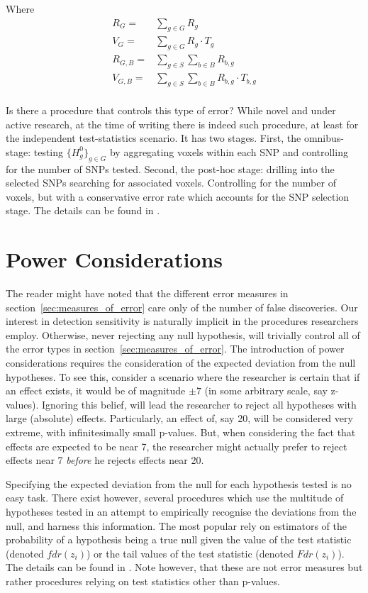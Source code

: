 \documentclass[draft,12pt]{article}
\begin{document}
Where 
\begin{align*} 
   R_G = {}& \sum_{g \in G} R_g \\
   V_G = {}& \sum_{g \in G} R_g \cdot T_g \\
   R_{G,B} = {}& \sum_{g \in S} \sum_{b \in B} R_{b,g}\\
   V_{G,B} = {}& \sum_{g \in S} \sum_{b \in B} R_{b,g} \cdot T_{b,g}  \\
\end{align*}

Is there a procedure that controls this type of error? While novel and under active research, at the time of writing there is indeed such procedure, at least for the independent test-statistics scenario. It has two stages. 
First, the omnibus-stage:  testing $\{H^0_{g}\}_{g \in G}$ by aggregating voxels within each SNP and controlling for the number of SNPs tested. Second, the post-hoc stage: drilling into the selected SNPs searching for associated voxels. Controlling for the number of voxels, but with a conservative error rate which accounts for the SNP selection stage. 
The details can be found in \citet{benjamini_adjusting_2011}.




\section{Power Considerations}
The reader might have noted that the different error measures in section~\ref{sec:measures_of_error} care only of the number of false discoveries. Our interest in detection sensitivity is naturally implicit in the procedures researchers employ. Otherwise, never rejecting any null hypothesis, will trivially control all of the error types in section~\ref{sec:measures_of_error}. 
The introduction of power considerations requires the consideration of the expected deviation from the null hypotheses. To see this, consider a scenario where the researcher is certain that if an effect exists, it would be of magnitude $\pm7$ (in some arbitrary scale, say z-values). Ignoring this belief, will lead the researcher to reject all hypotheses with large (absolute) effects. Particularly, an effect of, say 20,  will be considered very extreme, with infinitesimally small p-values. But, when considering the fact that effects are expected to be near 7, the researcher might actually prefer to reject effects near 7 \emph{before} he rejects effects near 20. 

Specifying the expected deviation from the null for each hypothesis tested is no easy task. There exist however, several procedures which use the multitude of hypotheses tested in an attempt to empirically recognise the deviations from the null, and harness this information. The most popular rely on estimators of the probability of a hypothesis being a true null given the value of the test statistic (denoted $fdr(z_i)$) or the tail values of the test statistic (denoted $Fdr(z_i)$). The details can be found in \cite{efron_microarrays_2008}. Note however, that these are not error measures but rather procedures relying on test statistics other than p-values.  
\end{document}
